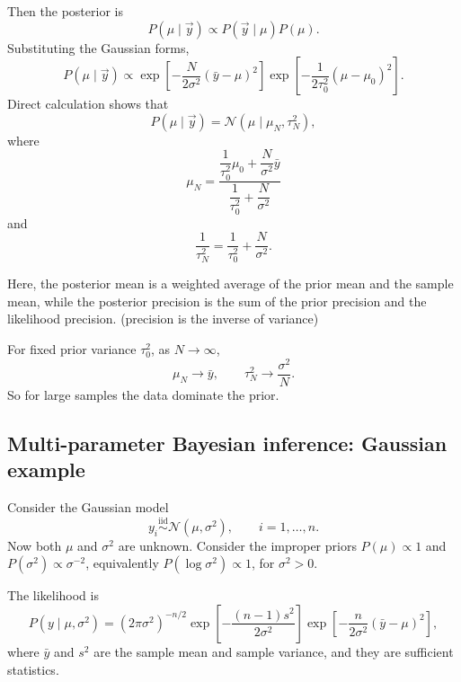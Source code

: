 \documentclass[11pt, titlepage]{article} %
\numberwithin{equation}{section}
\theoremstyle{definition}
\numberwithin{assumption}{section}
\begin{document}
Then the posterior is
\begin{equation*}
    P(\mu\mid \vec y)\propto P(\vec y\mid \mu)P(\mu).
\end{equation*}
Substituting the Gaussian forms,
\begin{equation*}
    P(\mu\mid \vec y)
    \propto
    \exp\!\left[-\frac{N}{2\sigma^2}(\bar y-\mu)^2\right]
    \exp\!\left[-\frac{1}{2\tau_0^2}(\mu-\mu_0)^2\right].
\end{equation*}
Direct calculation shows that
\begin{equation*}
    P(\mu\mid \vec y)=\mathcal{N}(\mu\mid \mu_N,\tau_N^2),
\end{equation*}
where
\begin{equation*}
    \mu_N
    =
    \frac{\dfrac{1}{\tau_0^2}\mu_0+\dfrac{N}{\sigma^2}\bar y}
    {\dfrac{1}{\tau_0^2}+\dfrac{N}{\sigma^2}}
\end{equation*}
and
\begin{equation*}
    \frac{1}{\tau_N^2}
    =
    \frac{1}{\tau_0^2}+\frac{N}{\sigma^2}.
\end{equation*}

Here, the posterior mean is a weighted average of the prior mean and the sample mean, while the posterior precision is the sum of the prior precision and the likelihood precision. (precision is the inverse of variance)

For fixed prior variance $\tau_0^2$, as $N\to\infty$,
\begin{equation*}
    \mu_N\to \bar y,
    \qquad
    \tau_N^2\to \frac{\sigma^2}{N}.
\end{equation*}
So for large samples the data dominate the prior.




\subsection{Multi-parameter Bayesian inference: Gaussian example}\label{subsection:multi-parameter_bayesian_inference:gaussian}

Consider the Gaussian model
\begin{equation*}
    y_i \overset{\mathrm{iid}}{\sim} \mathcal{N}(\mu,\sigma^2),
    \qquad i=1,\dots,n.
\end{equation*}
Now both $\mu$ and $\sigma^2$ are unknown.
Consider the improper priors $P(\mu)\propto 1$ and $P(\sigma^2)\propto \sigma^{-2}$, equivalently $P(\log \sigma^2)\propto 1$, for $\sigma^2>0$.

The likelihood is
\begin{equation*}
    P(y\mid \mu,\sigma^2)
    =
    (2\pi\sigma^2)^{-n/2}
    \exp\!\left[
    -\frac{(n-1)s^2}{2\sigma^2}
    \right]
    \exp\!\left[
    -\frac{n}{2\sigma^2}(\bar y-\mu)^2
    \right],
\end{equation*}
where $\bar y$ and $s^2$ are the sample mean and sample variance, and they are sufficient statistics.
\end{document}
